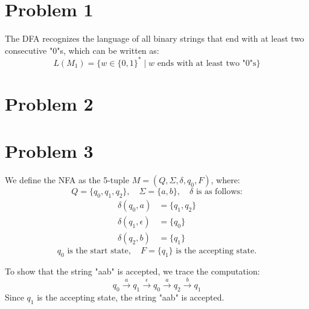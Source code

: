 \documentclass[12 pt]{article}
\begin{document}
\section*{Problem 1}	

The DFA recognizes the language of all binary strings that end with at least two consecutive "0"s, which can be written as:
\[
L(M_1) = \{ w \in \{0,1\}^* \mid w \text{ ends with at least two "0"s} \}
\]

\vspace{20pt}

\section*{Problem 2}							


\vspace{20pt}

\section*{Problem 3}
We define the NFA as the 5-tuple \(M = (Q, \Sigma, \delta, q_0, F)\), where:
\[
Q = \{q_0, q_1, q_2\}, \quad \Sigma = \{a, b\}, \quad \delta \text{ is as follows:}
\]
\[
\begin{aligned}
\delta(q_0, a) &= \{q_1, q_2\} \\
\delta(q_1, \epsilon) &= \{q_0\} \\
\delta(q_2, b) &= \{q_1\}
\end{aligned}
\]
\[
q_0 \text{ is the start state}, \quad F = \{q_1\} \text{ is the accepting state}.
\]

To show that the string "aab" is accepted, we trace the computation:
\[
q_0 \xrightarrow{a} q_1 \xrightarrow{\epsilon} q_0 \xrightarrow{a} q_2 \xrightarrow{b} q_1
\]
Since $q_1$ is the accepting state, the string "aab" is accepted.
\end{document}
